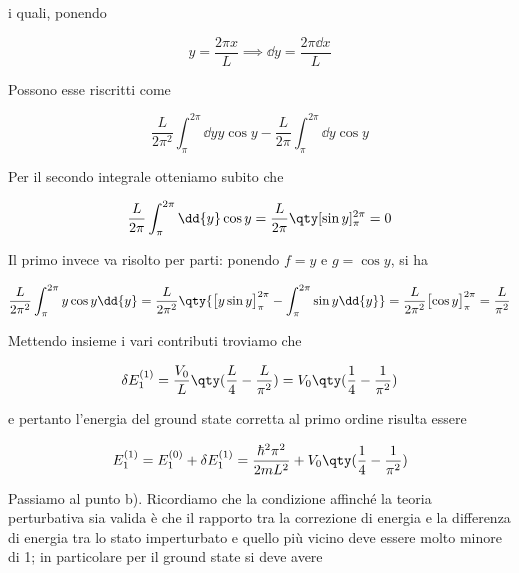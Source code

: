 \begin{soluzione}
   i quali, ponendo

   \begin{equation*}
      y=\frac{2\pi x}{L}
      \implies
      \dd{y}=\frac{2\pi \dd{x}}{L}
   \end{equation*}

   Possono esse riscritti come

   \begin{equation*}
      \frac{L}{2\pi^2} \int_{\pi}^{2\pi} \dd{y} y \cos{y} - \frac{L}{2\pi} \int_{\pi}^{2\pi} \dd{y} \cos{y}
   \end{equation*}

   Per il secondo integrale otteniamo subito che
   
   \begin{equation*}
      \frac{L}{2\pi} \int_{\pi}^{2\pi} \dd{y} \cos{y}
      =\frac{L}{2\pi} \qty[ \sin{y} ]_{\pi}^{2\pi}
      =0
   \end{equation*}

   Il primo invece va risolto per parti: ponendo $f=y$ e $g=\cos{y}$, si ha

   \begin{equation*}
      \frac{L}{2\pi^2} \int_{\pi}^{2\pi} y \cos{y} \dd{y}
      =\frac{L}{2\pi^2} \qty{ \bigl[ y \sin{y} \bigr]_{\pi}^{2\pi} - \int_{\pi}^{2\pi} \sin{y} \dd{y} }
      =\frac{L}{2\pi^2} \bigl[ \cos{y} \bigr]_{\pi}^{2\pi}
      =\frac{L}{\pi^2}
   \end{equation*}

   Mettendo insieme i vari contributi troviamo che

   \begin{equation*}
      \delta E_1^{(1)}
      =\frac{V_0}{L} \qty( \frac{L}{4} - \frac{L}{\pi^2} )
      =V_0\qty( \frac{1}{4} - \frac{1}{\pi^2} )
   \end{equation*}

   e pertanto l'energia del ground state corretta al primo ordine risulta essere

   \begin{equation*}
      E_1^{(1)}
      =E_1^{(0)} + \delta E_1^{(1)}
      =\frac{\hbar^2 \pi^2}{2 m L^2} + V_0\qty( \frac{1}{4} - \frac{1}{\pi^2} )
   \end{equation*}

   Passiamo al punto b). Ricordiamo che la condizione affinché la teoria perturbativa sia valida è che il rapporto tra la correzione di energia e la differenza di energia tra lo stato imperturbato e quello più vicino deve essere molto minore di 1; in particolare per il ground state si deve avere
   

\end{soluzione}
